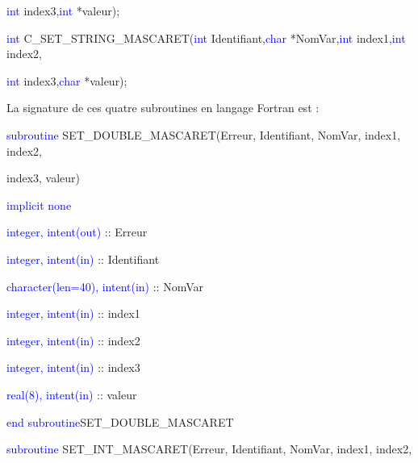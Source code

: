 \documentclass[a4paper,11pt]{article}
\begin{document}
 \textcolor{blue}{int} index3,\textcolor{blue}{int} *valeur);
 
 \textcolor{blue}{int} C\_SET\_STRING\_MASCARET(\textcolor{blue}{int} Identifiant,\textcolor{blue}{char} *NomVar,\textcolor{blue}{int} index1,\textcolor{blue}{int} index2,
 
 \textcolor{blue}{int} index3,\textcolor{blue}{char} *valeur);
 
 \vspace{0.5cm} 
 
 La signature de ces quatre subroutines en langage Fortran est :
 
 \vspace{0.5cm}
 
    \textcolor{blue}{subroutine} SET\_DOUBLE\_MASCARET(Erreur, Identifiant, NomVar, index1, index2,
    
     index3, valeur)
    
        \hspace{1cm}\textcolor{blue}{implicit none}                 
        
        \hspace{1cm} \textcolor{blue}{integer, intent(out)} :: Erreur
        
        \hspace{1cm} \textcolor{blue}{integer, intent(in)}  :: Identifiant
        
        \hspace{1cm} \textcolor{blue}{character(len=40), intent(in)}  :: NomVar
        
        \hspace{1cm} \textcolor{blue}{integer, intent(in)}  :: index1
        
        \hspace{1cm} \textcolor{blue}{integer, intent(in)}  :: index2
        
        \hspace{1cm} \textcolor{blue}{integer, intent(in)}  :: index3
        
        \hspace{1cm} \textcolor{blue}{real(8), intent(in)}  :: valeur
        
    \textcolor{blue}{end subroutine}SET\_DOUBLE\_MASCARET

 \vspace{0.5cm}
 
 \vspace{0.5cm}
 
    \textcolor{blue}{subroutine} SET\_INT\_MASCARET(Erreur, Identifiant, NomVar, index1, index2,
    
\end{document}

